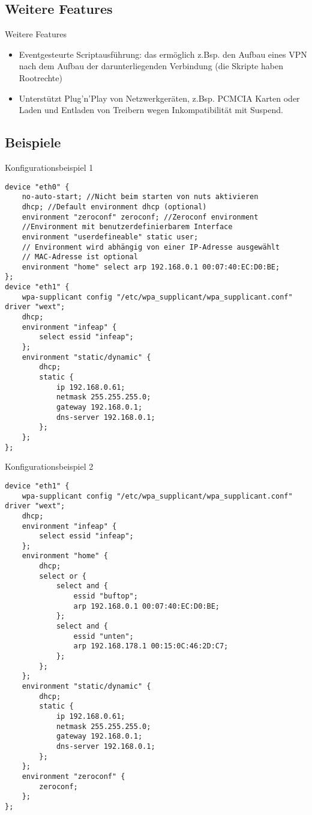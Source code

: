 \subsection{Weitere Features}
\begin{frame}[<+-|alert@+>]{Weitere Features}
	\begin{itemize}
		\item Eventgesteurte Scriptausführung: das ermöglich z.Bsp. den Aufbau eines VPN nach dem Aufbau der darunterliegenden Verbindung (die Skripte haben Rootrechte)
		\item Unterstützt Plug'n'Play von Netzwerkgeräten, z.Bsp. PCMCIA Karten oder Laden und Entladen von Treibern wegen Inkompatibilität mit Suspend.
	\end{itemize}
\end{frame}

\subsection{Beispiele}
\begin{frame}[fragile]{Konfigurationsbeispiel 1}
\tiny
\begin{verbatim}
device "eth0" {
    no-auto-start; //Nicht beim starten von nuts aktivieren
    dhcp; //Default environment dhcp (optional)
    environment "zeroconf" zeroconf; //Zeroconf environment
    //Environment mit benutzerdefinierbarem Interface
    environment "userdefineable" static user;
    // Environment wird abhängig von einer IP-Adresse ausgewählt
    // MAC-Adresse ist optional
    environment "home" select arp 192.168.0.1 00:07:40:EC:D0:BE;
};
device "eth1" {
    wpa-supplicant config "/etc/wpa_supplicant/wpa_supplicant.conf" driver "wext";
    dhcp;
    environment "infeap" {
        select essid "infeap";
    };
    environment "static/dynamic" {
        dhcp;
        static {
            ip 192.168.0.61;
            netmask 255.255.255.0;
            gateway 192.168.0.1;
            dns-server 192.168.0.1;
        };
    };
};
\end{verbatim}
\end{frame}

\begin{frame}[fragile]{Konfigurationsbeispiel 2}
\fontsize{4.8}{5.8} \selectfont
\begin{verbatim}
device "eth1" {
    wpa-supplicant config "/etc/wpa_supplicant/wpa_supplicant.conf" driver "wext";
    dhcp;
    environment "infeap" {
        select essid "infeap";
    };
    environment "home" {
        dhcp;
        select or {
            select and {
                essid "buftop";
                arp 192.168.0.1 00:07:40:EC:D0:BE;
            };
            select and {
                essid "unten";
                arp 192.168.178.1 00:15:0C:46:2D:C7;
            };
        };
    };
    environment "static/dynamic" {
        dhcp;
        static {
            ip 192.168.0.61;
            netmask 255.255.255.0;
            gateway 192.168.0.1;
            dns-server 192.168.0.1;
        };
    };
    environment "zeroconf" {
        zeroconf;
    };
};
\end{verbatim}
\end{frame}
